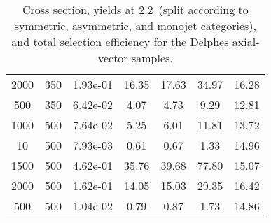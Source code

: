 \begin{table}
\begin{tabular}{ccccccc}
2000      &   350       &   1.93e-01  &   16.35     &   17.63     &   34.97     &   16.28     \\ 
500       &   350       &   6.42e-02  &   4.07      &   4.73      &   9.29      &   12.81     \\ 
1000      &   500       &   7.64e-02  &   5.25      &   6.01      &   11.81     &   13.72     \\ 
10        &   500       &   7.93e-03  &   0.61      &   0.67      &   1.33      &   14.96     \\ 
1500      &   500       &   4.62e-01  &   35.76     &   39.68     &   77.80     &   15.07     \\ 
2000      &   500       &   1.62e-01  &   14.05     &   15.03     &   29.35     &   16.42     \\ 
500       &   500       &   1.04e-02  &   0.79      &   0.87      &   1.73      &   14.86     \\ 
\hline\hline
\end{tabular}
\caption{Cross section, yields at 2.2~\ifb (split according to symmetric, asymmetric, and monojet categories), and total selection efficiency for the Delphes axial-vector samples.}
\label{tab:summmary_ScorpionDMA}
\end{table}
